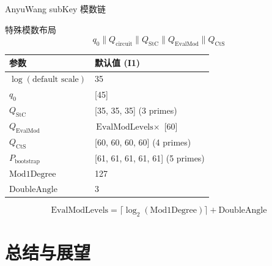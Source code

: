 \documentclass[aspectratio=169, 10pt, xcolor=svgnames, table, UTF8]{ctexbeamer}
\begin{document}
\begin{frame}{AnyuWang subKey 模数链}
  \begin{block}{特殊模数布局}
    \[
    \boxed{q_0 \parallel Q_{\mathrm{circuit}} \parallel Q_{\mathrm{StC}} \parallel Q_{\mathrm{EvalMod}} \parallel Q_{\mathrm{CtS}}}
    \]
  \end{block}
  
  \pause
  
  \begin{table}[h]
    \centering
    \small
    \begin{tabular}{@{}ll@{}}
      \toprule
      参数 & 默认值 (I1) \\
      \midrule
      \(\log(\text{default scale})\) & 35 \\
      \(q_0\) & [45] \\
      \(Q_{\mathrm{StC}}\) & [35, 35, 35] (3 primes) \\
      \(Q_{\mathrm{EvalMod}}\) & \(\text{EvalModLevels} \times\) [60] \\
      \(Q_{\mathrm{CtS}}\) & [60, 60, 60, 60] (4 primes) \\
      \(P_{\mathrm{bootstrap}}\) & [61, 61, 61, 61, 61] (5 primes) \\
      \(\mathrm{Mod1Degree}\) & 127 \\
      \(\mathrm{DoubleAngle}\) & 3 \\
      \bottomrule
    \end{tabular}
  \end{table}
  
  \[
  \mathrm{EvalModLevels} = \lceil\log_2(\mathrm{Mod1Degree})\rceil + \mathrm{DoubleAngle}
  \]
\end{frame}

\section{总结与展望}
\end{document}

